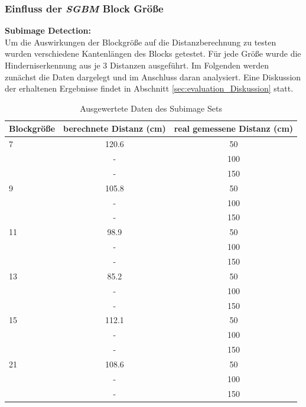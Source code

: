 \noindent
\subsubsection{Einfluss der \emph{SGBM} Block Größe}
\label{subsec:block_size_change}

\textbf{Subimage Detection:}\\
\noindent
Um die Auswirkungen der Blockgröße auf die Distanzberechnung zu testen wurden verschiedene Kantenlängen des Blocks getestet. Für jede Größe wurde die Hinderniserkennung aus je 3 Distanzen ausgeführt. Im Folgenden werden zunächst die Daten dargelegt und im Anschluss daran analysiert. Eine Diskussion der erhaltenen Ergebnisse findet in Abschnitt \ref{sec:evaluation_Diskussion} statt.\\

\begin{table}[h]
\centering
\begin{tabular}{|l||c|c|}
\hline
Blockgröße & berechnete Distanz (cm)& real gemessene Distanz (cm)\\
\hline\hline
7          & 120.6          		& 50                     \\
           &  -                 & 100                    \\
           &  -                 & 150                    \\
\hline
9          & 105.8          		& 50                     \\
           &  -                 & 100                    \\
           &  -                 & 150                    \\
\hline
11         & 98.9           		& 50                     \\
           &  -                 & 100                    \\
           &  -                 & 150                    \\
\hline
13         & 85.2          		& 50                     \\
           &  -                 & 100                    \\
           &  -                 & 150                    \\
\hline
15         & 112.1		        & 50                     \\
           &  -                 & 100                    \\
           &  -                 & 150                    \\
\hline
21         & 108.6         		& 50                     \\
           &  -                 & 100                    \\
           &  -                 & 150                    \\
\hline
\end{tabular}
\caption{Ausgewertete Daten des Subimage Sets}
\label{tbl:distance_subimage}
\end{table}	

